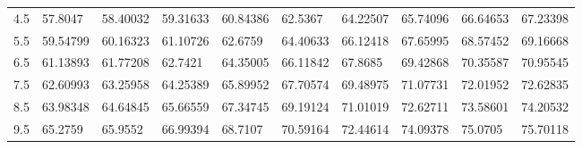 \documentclass[10pt,twocolumn,letterpaper]{article}
\begin{document}
\begin{table}
\begin{tabular}{llllllllll}
    4.5             & 57.8047                                & 58.40032                               & 59.31633                                & 60.84386                                & 62.5367                                 & 64.22507                                & 65.74096                                & 66.64653                                & 67.23398                                \\
    5.5             & 59.54799                               & 60.16323                               & 61.10726                                & 62.6759                                 & 64.40633                                & 66.12418                                & 67.65995                                & 68.57452                                & 69.16668                                \\
    6.5             & 61.13893                               & 61.77208                               & 62.7421                                 & 64.35005                                & 66.11842                                & 67.8685                                 & 69.42868                                & 70.35587                                & 70.95545                                \\
    7.5             & 62.60993                               & 63.25958                               & 64.25389                                & 65.89952                                & 67.70574                                & 69.48975                                & 71.07731                                & 72.01952                                & 72.62835                                \\
    8.5             & 63.98348                               & 64.64845                               & 65.66559                                & 67.34745                                & 69.19124                                & 71.01019                                & 72.62711                                & 73.58601                                & 74.20532                                \\
    9.5             & 65.2759                                & 65.9552                                & 66.99394                                & 68.7107                                 & 70.59164                                & 72.44614                                & 74.09378                                & 75.0705                                 & 75.70118                                \\

\end{tabular}
\end{table}
\end{document}
